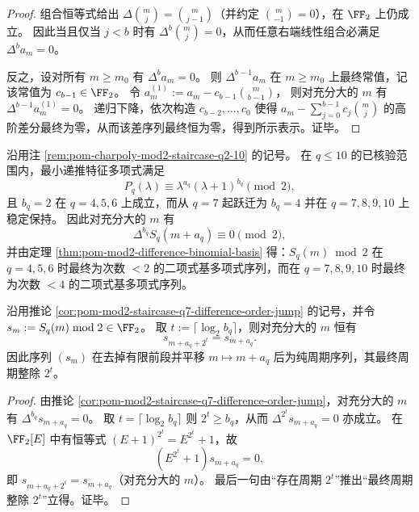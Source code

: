 \begin{proof}
组合恒等式给出 \(\Delta\binom{m}{j}=\binom{m}{j-1}\)（并约定 \(\binom{m}{-1}=0\)），在 \(\FF_2\) 上仍成立。
因此当且仅当 \(j<b\) 时有 \(\Delta^b\binom{m}{j}=0\)，从而任意右端线性组合必满足 \(\Delta^b a_m=0\)。
\par
反之，设对所有 \(m\ge m_0\) 有 \(\Delta^b a_m=0\)。
则 \(\Delta^{b-1}a_m\) 在 \(m\ge m_0\) 上最终常值，记该常值为 \(c_{b-1}\in\FF_2\)。
令
\(
a^{(1)}_m:=a_m-c_{b-1}\binom{m}{b-1}
\)，
则对充分大的 \(m\) 有 \(\Delta^{b-1}a^{(1)}_m=0\)。
递归下降，依次构造 \(c_{b-2},\dots,c_0\) 使得
\(
a_m-\sum_{j=0}^{b-1}c_j\binom{m}{j}
\)
的高阶差分最终为零，从而该差序列最终恒为零，得到所示表示。证毕。
\end{proof}

\begin{corollary}[碰撞矩序列的模 \(2\) 阶跃：\(q=7\) 处差分阶数从 \(2\) 跃迁到 \(4\)]\label{cor:pom-mod2-staircase-q7-difference-order-jump}
沿用注 \ref{rem:pom-charpoly-mod2-staircase-q2-10} 的记号。
在 \(q\le 10\) 的已核验范围内，最小递推特征多项式满足
\[
P_q(\lambda)\equiv \lambda^{a_q}(\lambda+1)^{b_q}\pmod 2,
\]
且 \(b_q=2\) 在 \(q=4,5,6\) 上成立，而从 \(q=7\) 起跃迁为 \(b_q=4\) 并在 \(q=7,8,9,10\) 上稳定保持。
因此对充分大的 \(m\) 有
\[
\Delta^{b_q}S_q(m+a_q)\equiv 0\pmod 2,
\]
并由定理 \ref{thm:pom-mod2-difference-binomial-basis} 得：\(S_q(m)\bmod 2\) 在 \(q=4,5,6\) 时最终为次数 \(<2\) 的二项式基多项式序列，而在 \(q=7,8,9,10\) 时最终为次数 \(<4\) 的二项式基多项式序列。
\end{corollary}

\begin{corollary}[模 \(2\) 影子差分推出最终周期与周期上界]\label{cor:pom-mod2-shadow-eventual-period-bound}
沿用推论 \ref{cor:pom-mod2-staircase-q7-difference-order-jump} 的记号，并令 \(s_m:=S_q(m)\bmod 2\in\FF_2\)。
取 \(t:=\lceil\log_2 b_q\rceil\)，则对充分大的 \(m\) 恒有
\[
s_{m+a_q+2^t}=s_{m+a_q}.
\]
因此序列 \((s_m)\) 在去掉有限前段并平移 \(m\mapsto m+a_q\) 后为纯周期序列，其最终周期整除 \(2^t\)。
\end{corollary}

\begin{proof}
由推论 \ref{cor:pom-mod2-staircase-q7-difference-order-jump}，对充分大的 \(m\) 有 \(\Delta^{b_q}s_{m+a_q}=0\)。
取 \(t=\lceil\log_2 b_q\rceil\) 则 \(2^t\ge b_q\)，从而 \(\Delta^{2^t}s_{m+a_q}=0\) 亦成立。
在 \(\FF_2[E]\) 中有恒等式 \((E+1)^{2^t}=E^{2^t}+1\)，故
\[
(E^{2^t}+1)s_{m+a_q}=0,
\]
即 \(s_{m+a_q+2^t}=s_{m+a_q}\)（对充分大的 \(m\)）。
最后一句由“存在周期 \(2^t\)”推出“最终周期整除 \(2^t\)”立得。证毕。
\end{proof}


